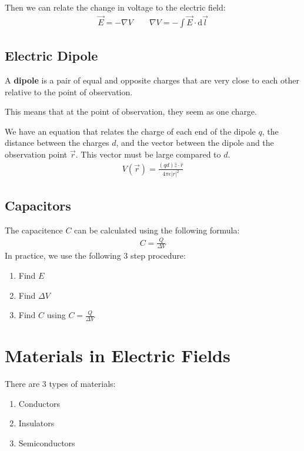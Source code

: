 \documentclass[12pt,letterpaper]{article} \usepackage{amsmath} \usepackage{graphicx} \usepackage[margin=1in]{geometry} \usepackage{longtable}  \usepackage{amssymb}
\begin{document}
	Then we can relate the change in voltage to the electric field:
	\begin{align*}
		\vec E = -\nabla V \qquad \nabla V = -\int \vec E\cdot \mathrm d \vec l
	\end{align*}

	\subsection{Electric Dipole}
	A \textbf{dipole} is a pair of equal and opposite charges that are very close to each other relative to the point of observation.
	
	This means that at the point of observation, they seem as one charge. 
	
	We have an equation that relates the charge of each end of the dipole $q$, the distance between the charges $d$, and the vector between the dipole and the observation point $\vec r$. This vector must be large compared to $d$.
	\begin{align*}
		V(\vec r) = \frac{(qd) \hat z \cdot \hat r}{4\pi \epsilon |r|^2}
	\end{align*}

	\subsection{Capacitors}
	The capacitence $C$ can be calculated using the following formula:
	\begin{align*}
		C=\frac{Q}{\Delta V}
	\end{align*}
	In practice, we use the following 3 step procedure:
	\begin{enumerate}[noitemsep]
		\item Find $E$
		\item Find $\Delta V$
		\item Find $C$ using $C=\frac{Q}{\Delta V} $
	\end{enumerate}
	
	\section{Materials in Electric Fields}
	There are 3 types of materials:
	\begin{enumerate}[]
		\item Conductors
		\item Insulators
		\item Semiconductors
	\end{enumerate}
\end{document}
